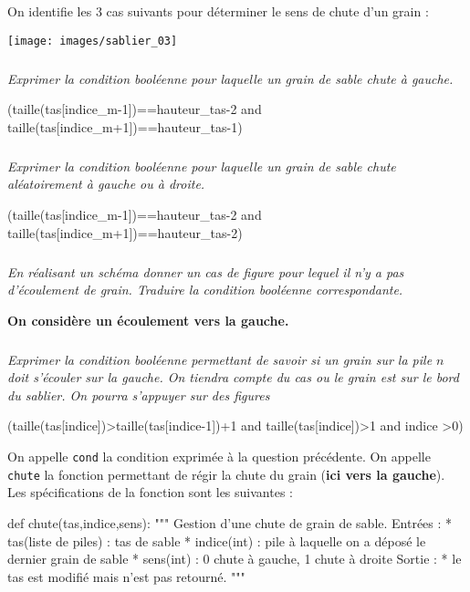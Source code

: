 \documentclass[10pt,fleqn]{article} %
\begin{document}
On identifie les 3 cas suivants pour déterminer le sens de chute d'un grain :
\begin{center}
\texttt{[image: images/sablier\_03]}
\end{center}
\fi

\subparagraph{}
\textit{Exprimer la condition booléenne pour laquelle un grain de sable chute à gauche.}
\ifprof
\begin{corrige}
\begin{python}
(taille(tas[indice_m-1])==hauteur_tas-2 and taille(tas[indice_m+1])==hauteur_tas-1)
\end{python}
\end{corrige}
\else
\fi

\subparagraph{}
\textit{Exprimer la condition booléenne pour laquelle un grain de sable chute aléatoirement à gauche ou à droite.}
\ifprof
\begin{corrige}
\begin{python}
(taille(tas[indice_m-1])==hauteur_tas-2 and taille(tas[indice_m+1])==hauteur_tas-2)
\end{python}
\end{corrige}
\else
\fi

\subparagraph{}
\textit{En réalisant un schéma donner un cas de figure pour lequel il n'y a pas d'écoulement de grain. Traduire la condition booléenne correspondante.}
\ifprof
\begin{corrige}

\end{corrige}
\else
\fi

\textbf{On considère un écoulement vers la gauche.}

\subparagraph{}
\textit{Exprimer la condition booléenne permettant de savoir si un grain sur la pile $n$ doit s'écouler sur la gauche. On tiendra compte du cas ou le grain est sur le bord du sablier. On pourra s'appuyer sur des figures}
\ifprof
\begin{corrige}
\begin{python}
(taille(tas[indice])>taille(tas[indice-1])+1 and taille(tas[indice])>1 and indice >0)
\end{python}
\end{corrige}
\else
\fi

\vspace{.25cm}

On appelle \texttt{cond} la condition exprimée à la question précédente.
On appelle \texttt{chute} la fonction permettant de régir la chute du grain (\textbf{ici vers la gauche}). Les spécifications de la fonction sont les suivantes : 
\begin{py}
\begin{python}
def chute(tas,indice,sens):
    """
    Gestion d'une chute de grain de sable.
    Entrées : 
     * tas(liste de piles) : tas de sable
     * indice(int) : pile à laquelle on a déposé le dernier grain de sable
     * sens(int) : 0 chute à gauche, 1 chute à droite
    Sortie : 
     * le tas est modifié mais n'est pas retourné.
    """
\end{python}
\end{py}
\end{document}
